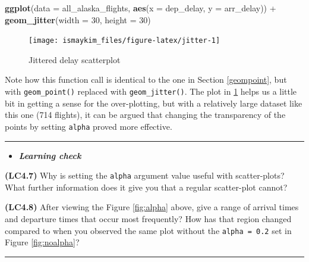 \documentclass[]{tufte-book}
\newenvironment{Shaded}{\begin{snugshade}}{\end{snugshade}}
\newcommand{\KeywordTok}[1]{\textcolor[rgb]{0.13,0.29,0.53}{\textbf{{#1}}}}
\newcommand{\DataTypeTok}[1]{\textcolor[rgb]{0.13,0.29,0.53}{{#1}}}
\newcommand{\DecValTok}[1]{\textcolor[rgb]{0.00,0.00,0.81}{{#1}}}
\newcommand{\StringTok}[1]{\textcolor[rgb]{0.31,0.60,0.02}{{#1}}}
\newcommand{\NormalTok}[1]{{#1}}
\let\oldrule=\rule
\renewcommand{\rule}[1]{\oldrule{\linewidth}}
\newenvironment{rmdblock}[1]
  {\begin{shaded*}
  \begin{itemize}
  \renewcommand{\labelitemi}{
    \raisebox{-.7\height}[0pt][0pt]{
    }
  }
  \item
  }
  {
  \end{itemize}
  \end{shaded*}
  }
\newenvironment{learncheck}
  {\begin{rmdblock}{warning}}
  {\end{rmdblock}}
\begin{document}
\begin{Shaded}
\begin{Highlighting}[]
\KeywordTok{ggplot}\NormalTok{(}\DataTypeTok{data =} \NormalTok{all_alaska_flights, }\KeywordTok{aes}\NormalTok{(}\DataTypeTok{x =} \NormalTok{dep_delay, }\DataTypeTok{y =} \NormalTok{arr_delay)) +}\StringTok{ }
\StringTok{  }\KeywordTok{geom_jitter}\NormalTok{(}\DataTypeTok{width =} \DecValTok{30}\NormalTok{, }\DataTypeTok{height =} \DecValTok{30}\NormalTok{)}
\end{Highlighting}
\end{Shaded}

\begin{figure}

{\centering \texttt{[image: ismaykim\_files/figure-latex/jitter-1]} 

}

\caption[Jittered delay scatterplot]{Jittered delay scatterplot}\label{fig:jitter}
\end{figure}

Note how this function call is identical to the one in Section
\ref{geompoint}, but with \texttt{geom\_point()} replaced with
\texttt{geom\_jitter()}. The plot in \ref{fig:jitter} helps us a little
bit in getting a sense for the over-plotting, but with a relatively
large dataset like this one (714 flights), it can be argued that
changing the transparency of the points by setting \texttt{alpha} proved
more effective.

\begin{center}\rule{0.5\linewidth}{\linethickness}\end{center}

\begin{learncheck}
\textbf{\emph{Learning check}}
\end{learncheck}

\textbf{(LC4.7)} Why is setting the \texttt{alpha} argument value useful
with scatter-plots? What further information does it give you that a
regular scatter-plot cannot?

\textbf{(LC4.8)} After viewing the Figure \ref{fig:alpha} above, give a
range of arrival times and departure times that occur most frequently?
How has that region changed compared to when you observed the same plot
without the \texttt{alpha\ =\ 0.2} set in Figure \ref{fig:noalpha}?

\begin{center}\rule{0.5\linewidth}{\linethickness}\end{center}
\end{document}
